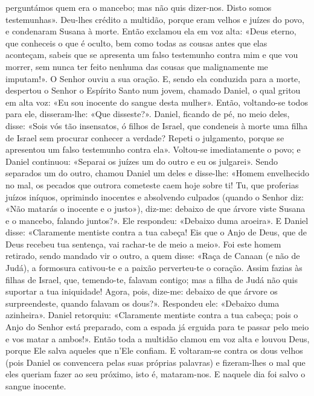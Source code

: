 \begin{paracol}{2}
{perguntámos quem era o mancebo; mas não quis dizer-nos. Disto somos testemunhas». Deu-lhes crédito a multidão, porque eram velhos e juízes do povo, e condenaram Susana à morte. Então exclamou ela em voz alta: «Deus eterno, que conheceis o que é oculto, bem como todas as cousas antes que elas aconteçam, sabeis que se apresenta um falso testemunho contra mim e que vou morrer, sem nunca ter feito nenhuma das cousas que malignamente me imputam!». O Senhor ouviu a sua oração. E, sendo ela conduzida para a morte, despertou o Senhor o Espírito Santo num jovem, chamado Daniel, o qual gritou em alta voz: «Eu sou inocente do sangue desta mulher». Então, voltando-se todos para ele, disseram-lhe: «Que disseste?». Daniel, ficando de pé, no meio deles, disse: «Sois vós tão insensatos, ó filhos de Israel, que condeneis à morte uma filha de Israel sem procurar conhecer a verdade? Repeti o julgamento, porque se apresentou um falso testemunho contra ela». Voltou-se imediatamente o povo; e Daniel continuou: «Separai os juízes um do outro e eu os julgarei». Sendo separados um do outro, chamou Daniel um deles e disse-lhe: «Homem envelhecido no mal, os pecados que outrora cometeste caem hoje sobre ti! Tu, que proferias juízos iníquos, oprimindo inocentes e absolvendo culpados (quando o Senhor diz: «Não matarás o inocente e o justo»), diz-me: debaixo de que árvore viste Susana e o mancebo, falando juntos?». Ele respondeu: «Debaixo duma aroeira». E Daniel disse: «Claramente mentiste contra a tua cabeça! Eis que o Anjo de Deus, que de Deus recebeu tua sentença, vai rachar-te de meio a meio». Foi este homem retirado, sendo mandado vir o outro, a quem disse: «Raça de Canaan (e não de Judá), a formosura cativou-te e a paixão perverteu-te o coração. Assim fazias às filhas de Israel, que, temendo-te, falavam contigo; mas a filha de Judá não quis suportar a tua iniquidade! Agora, pois, dize-me: debaixo de que árvore os surpreendeste, quando falavam os dous?». Respondeu ele: «Debaixo duma azinheira». Daniel retorquiu: «Claramente mentiste contra a tua cabeça; pois o Anjo do Senhor está preparado, com a espada já erguida para te passar pelo meio e vos matar a ambos!». Então toda a multidão clamou em voz alta e louvou Deus, porque Ele salva aqueles que n’Ele confiam. E voltaram-se contra os dous velhos (pois Daniel os convencera pelas suas próprias palavras) e fizeram-lhes o mal que eles queriam fazer ao seu próximo, isto é, mataram-nos. E naquele dia foi salvo o sangue inocente.
}\end{paracol}

\begin{paracol}{2}\switchcolumn{}\end{paracol}

